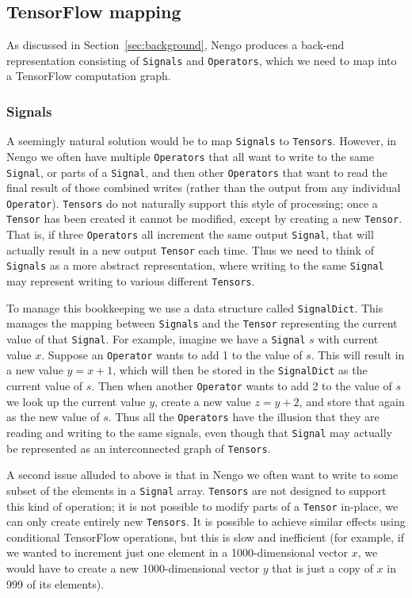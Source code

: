 \documentclass{article}
\begin{document}
\subsection{TensorFlow mapping}

As discussed in Section~\ref{sec:background}, Nengo produces a back-end representation consisting of \texttt{Signals} and \texttt{Operators}, which we need to map into a TensorFlow computation graph.

\subsubsection{Signals}

A seemingly natural solution would be to map \texttt{Signals} to \texttt{Tensors}.  However, in Nengo we often have multiple \texttt{Operators} that all want to write to the same \texttt{Signal}, or parts of a \texttt{Signal}, and then other \texttt{Operators} that want to read the final result of those combined writes (rather than the output from any individual \texttt{Operator}).  \texttt{Tensors} do not naturally support this style of processing; once a \texttt{Tensor} has been created it cannot be modified, except by creating a new \texttt{Tensor}.  That is, if three \texttt{Operators} all increment the same output \texttt{Signal}, that will actually result in a new output \texttt{Tensor} each time.  Thus we need to think of \texttt{Signals} as a more abstract representation, where writing to the same \texttt{Signal} may represent writing to various different \texttt{Tensors}.

To manage this bookkeeping we use a data structure called \texttt{SignalDict}.  This manages the mapping between \texttt{Signals} and the \texttt{Tensor} representing the current value of that \texttt{Signal}.  For example, imagine we have a \texttt{Signal} $s$ with current value $x$.  Suppose an \texttt{Operator} wants to add 1 to the value of $s$.  This will result in a new value $y = x + 1$, which will then be stored in the \texttt{SignalDict} as the current value of $s$.  Then when another \texttt{Operator} wants to add 2 to the value of $s$ we look up the current value $y$, create a new value $z = y + 2$, and store that again as the new value of $s$.  Thus all the \texttt{Operators} have the illusion that they are reading and writing to the same signals, even though that \texttt{Signal} may actually be represented as an interconnected graph of \texttt{Tensors}.

A second issue alluded to above is that in Nengo we often want to write to some subset of the elements in a \texttt{Signal} array.  \texttt{Tensors} are not designed to support this kind of operation; it is not possible to modify parts of a \texttt{Tensor} in-place, we can only create entirely new \texttt{Tensors}.  It is possible to achieve similar effects using conditional TensorFlow operations, but this is slow and inefficient (for example, if we wanted to increment just one element in a 1000-dimensional vector $x$, we would have to create a new 1000-dimensional vector $y$ that is just a copy of $x$ in 999 of its elements).
\end{document}
